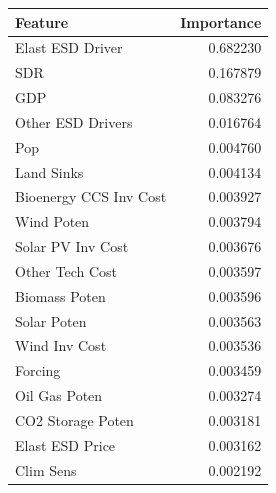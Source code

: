 \begin{tabular}{lr}
\toprule
Feature & Importance \\
\midrule
Elast ESD Driver & 0.682230 \\
SDR & 0.167879 \\
GDP & 0.083276 \\
Other ESD Drivers & 0.016764 \\
Pop & 0.004760 \\
Land Sinks & 0.004134 \\
Bioenergy CCS Inv Cost & 0.003927 \\
Wind Poten & 0.003794 \\
Solar PV Inv Cost & 0.003676 \\
Other Tech Cost & 0.003597 \\
Biomass Poten & 0.003596 \\
Solar Poten & 0.003563 \\
Wind Inv Cost & 0.003536 \\
Forcing & 0.003459 \\
Oil Gas Poten & 0.003274 \\
CO2 Storage Poten & 0.003181 \\
Elast ESD Price & 0.003162 \\
Clim Sens & 0.002192 \\
\bottomrule
\end{tabular}
